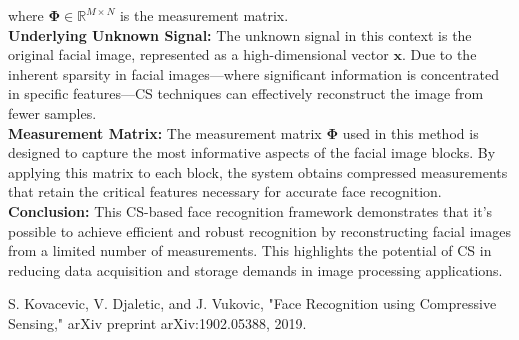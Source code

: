 \documentclass{article}
\begin{document}
\begin{enumerate}
    where $\mathbf{\Phi} \in \mathbb{R}^{M \times N}$ is the measurement matrix. \\

    \textbf{Underlying Unknown Signal:} The unknown signal in this context is the original facial image, represented as a high-dimensional vector $\mathbf{x}$. Due to the inherent sparsity in facial images—where significant information is concentrated in specific features—CS techniques can effectively reconstruct the image from fewer samples. \\

    \textbf{Measurement Matrix:} The measurement matrix $\mathbf{\Phi}$ used in this method is designed to capture the most informative aspects of the facial image blocks. By applying this matrix to each block, the system obtains compressed measurements that retain the critical features necessary for accurate face recognition. \\

    \textbf{Conclusion:} This CS-based face recognition framework demonstrates that it's possible to achieve efficient and robust recognition by reconstructing facial images from a limited number of measurements. This highlights the potential of CS in reducing data acquisition and storage demands in image processing applications. \\


\begin{thebibliography}{9}
    S. Kovacevic, V. Djaletic, and J. Vukovic, "Face Recognition using Compressive Sensing," arXiv preprint arXiv:1902.05388, 2019.
\end{thebibliography}

    
\end{enumerate}
\end{document}
